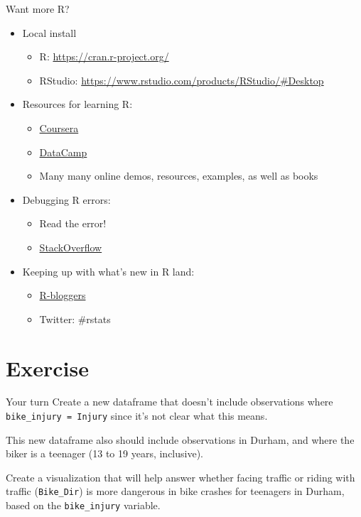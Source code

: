 \documentclass[
  ignorenonframetext,
]{beamer}
\providecommand{\tightlist}{%
  \setlength{\itemsep}{0pt}\setlength{\parskip}{0pt}}
\begin{document}
\begin{frame}{Want more R?}
\protect\hypertarget{want-more-r}{}
\begin{itemize}
\tightlist
\item
  Local install

  \begin{itemize}
  \tightlist
  \item
    R: \url{https://cran.r-project.org/}
  \item
    RStudio: \url{https://www.rstudio.com/products/RStudio/\#Desktop}
  \end{itemize}
\item
  Resources for learning R:

  \begin{itemize}
  \tightlist
  \item
    \href{https://www.coursera.org/}{Coursera}
  \item
    \href{https://www.datacamp.com/}{DataCamp}
  \item
    Many many online demos, resources, examples, as well as books
  \end{itemize}
\item
  Debugging R errors:

  \begin{itemize}
  \tightlist
  \item
    Read the error!
  \item
    \href{http://stackoverflow.com/}{StackOverflow}
  \end{itemize}
\item
  Keeping up with what's new in R land:

  \begin{itemize}
  \tightlist
  \item
    \href{http://www.r-bloggers.com/}{R-bloggers}
  \item
    Twitter: \#rstats
  \end{itemize}
\end{itemize}
\end{frame}

\hypertarget{exercise}{%
\section{Exercise}\label{exercise}}

\begin{frame}[fragile]{Your turn}
\protect\hypertarget{your-turn-4}{}
Create a new dataframe that doesn't include observations where
\texttt{bike\_injury\ =\ Injury} since it's not clear what this means.

This new dataframe also should include observations in Durham, and where
the biker is a teenager (13 to 19 years, inclusive).

Create a visualization that will help answer whether facing traffic or
riding with traffic (\texttt{Bike\_Dir}) is more dangerous in bike
crashes for teenagers in Durham, based on the \texttt{bike\_injury}
variable.
\end{frame}
\end{document}
